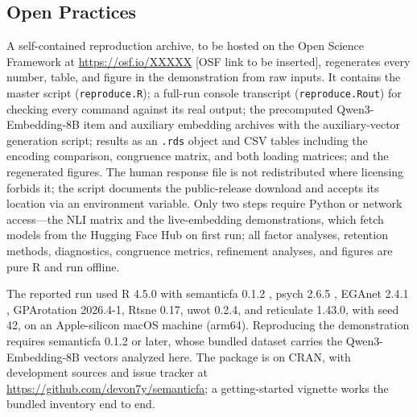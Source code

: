 \subsection{Open Practices}

A self-contained reproduction archive, to be hosted on the Open Science Framework at \url{https://osf.io/XXXXX} [OSF link to be inserted], regenerates every number, table, and figure in the demonstration from raw inputs. It contains the master script (\texttt{reproduce.R}); a full-run console transcript (\texttt{reproduce.Rout}) for checking every command against its real output; the precomputed Qwen3-Embedding-8B item and auxiliary embedding archives with the auxiliary-vector generation script; results as an \texttt{.rds} object and CSV tables including the encoding comparison, congruence matrix, and both loading matrices; and the regenerated figures. The human response file is not redistributed where licensing forbids it; the script documents the public-release download \citep{openpsychometrics-2018} and accepts its location via an environment variable. Only two steps require Python or network access---the NLI matrix and the live-embedding demonstrations, which fetch models from the Hugging Face Hub on first run; all factor analyses, retention methods, diagnostics, congruence metrics, refinement analyses, and figures are pure R and run offline.

The reported run used R 4.5.0 \citep{rcoreteam-2025} with semanticfa 0.1.2 \citep{yanitski-westbury-2026}, psych 2.6.5 \citep{revelle-2026}, EGAnet 2.4.1 \citep{golino-christensen-2026}, GPArotation 2026.4-1, Rtsne 0.17, uwot 0.2.4, and reticulate 1.43.0, with seed 42, on an Apple-silicon macOS machine (arm64). Reproducing the demonstration requires semanticfa 0.1.2 or later, whose bundled dataset carries the Qwen3-Embedding-8B vectors analyzed here. The package is on CRAN, with development sources and issue tracker at \url{https://github.com/devon7y/semanticfa}; a getting-started vignette works the bundled inventory end to end.

